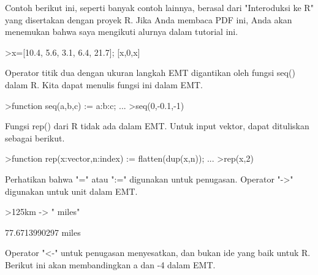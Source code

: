 \documentclass[12pt,arial,letterpaper]{book}
\begin{document}
\begin{eulernootebook}
\begin{eulercomment}
\begin{eulercomment}
\begin{eulernootebook}
\begin{eulercomment}
\begin{eulercomment}
\begin{eulercomment}
\begin{eulercomment}
\begin{eulercomment}
\begin{eulercomment}
\begin{eulercomment}
\begin{eulercomment}
\begin{eulercomment}
\begin{eulercomment}
\begin{eulercomment}
\begin{eulercomment}
Contoh berikut ini, seperti banyak contoh lainnya, berasal dari
"Interoduksi ke R" yang disertakan dengan proyek R. Jika Anda membaca
PDF ini, Anda akan menemukan bahwa saya mengikuti alurnya dalam
tutorial ini.
\end{eulercomment}
\begin{eulerprompt}
>x=[10.4, 5.6, 3.1, 6.4, 21.7]; [x,0,x]
\end{eulerprompt}
\begin{euleroutput}
  [10.4,  5.6,  3.1,  6.4,  21.7,  0,  10.4,  5.6,  3.1,  6.4,  21.7]
\end{euleroutput}
\begin{eulercomment}
Operator titik dua dengan ukuran langkah EMT digantikan oleh fungsi
seq() dalam R. Kita dapat menulis fungsi ini dalam EMT.
\end{eulercomment}
\begin{eulerprompt}
>function seq(a,b,c) := a:b:c; ...
>seq(0,-0.1,-1)
\end{eulerprompt}
\begin{euleroutput}
  [0,  -0.1,  -0.2,  -0.3,  -0.4,  -0.5,  -0.6,  -0.7,  -0.8,  -0.9,  -1]
\end{euleroutput}
\begin{eulercomment}
Fungsi rep() dari R tidak ada dalam EMT. Untuk input vektor, dapat
dituliskan sebagai berikut.
\end{eulercomment}
\begin{eulerprompt}
>function rep(x:vector,n:index) := flatten(dup(x,n)); ...
>rep(x,2)
\end{eulerprompt}
\begin{euleroutput}
  [10.4,  5.6,  3.1,  6.4,  21.7,  10.4,  5.6,  3.1,  6.4,  21.7]
\end{euleroutput}
\begin{eulercomment}
Perhatikan bahwa "=" atau ":=" digunakan untuk penugasan. Operator
"-\textgreater{}" digunakan untuk unit dalam EMT.
\end{eulercomment}
\begin{eulerprompt}
>125km -> " miles"
\end{eulerprompt}
\begin{euleroutput}
  77.6713990297 miles
\end{euleroutput}
\begin{eulercomment}
Operator "\textless{}-" untuk penugasan menyesatkan, dan bukan ide yang baik
untuk R. Berikut ini akan membandingkan a dan -4 dalam EMT.
\end{eulercomment}
\begin{eulerprompt}

\end{eulerprompt}
\end{eulercomment}
\end{eulercomment}
\end{eulercomment}
\end{eulercomment}
\end{eulercomment}
\end{eulercomment}
\end{eulercomment}
\end{eulercomment}
\end{eulercomment}
\end{eulercomment}
\end{eulercomment}
\end{eulernootebook}
\end{eulercomment}
\end{eulercomment}
\end{eulernootebook}
\end{document}
